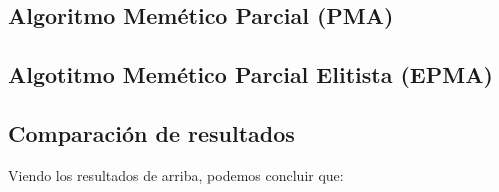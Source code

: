 \documentclass[a4paper, 11pt]{article}
\begin{document}
		\subsection{Algoritmo Memético Parcial (\textbf{PMA})}
			
			
			
		\subsection{Algotitmo Memético Parcial Elitista (\textbf{EPMA})}
			
			
			
		\subsection{Comparación de resultados}
			
			
			Viendo los resultados de arriba, podemos concluir que:
\end{document}
